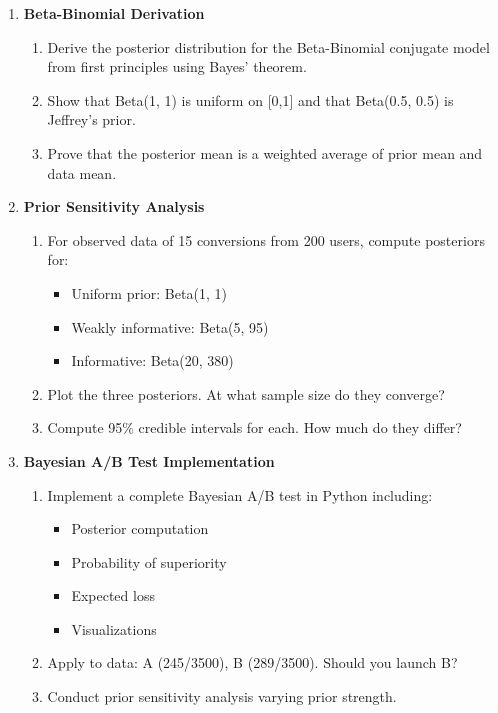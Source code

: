 \begin{enumerate}
    \item \textbf{Beta-Binomial Derivation}
    \begin{enumerate}
        \item Derive the posterior distribution for the Beta-Binomial conjugate model from first principles using Bayes' theorem.
        \item Show that Beta(1, 1) is uniform on [0,1] and that Beta(0.5, 0.5) is Jeffrey's prior.
        \item Prove that the posterior mean is a weighted average of prior mean and data mean.
    \end{enumerate}

    \item \textbf{Prior Sensitivity Analysis}
    \begin{enumerate}
        \item For observed data of 15 conversions from 200 users, compute posteriors for:
        \begin{itemize}
            \item Uniform prior: Beta(1, 1)
            \item Weakly informative: Beta(5, 95)
            \item Informative: Beta(20, 380)
        \end{itemize}
        \item Plot the three posteriors. At what sample size do they converge?
        \item Compute 95\% credible intervals for each. How much do they differ?
    \end{enumerate}

    \item \textbf{Bayesian A/B Test Implementation}
    \begin{enumerate}
        \item Implement a complete Bayesian A/B test in Python including:
        \begin{itemize}
            \item Posterior computation
            \item Probability of superiority
            \item Expected loss
            \item Visualizations
        \end{itemize}
        \item Apply to data: A (245/3500), B (289/3500). Should you launch B?
        \item Conduct prior sensitivity analysis varying prior strength.
    \end{enumerate}


\end{enumerate}
